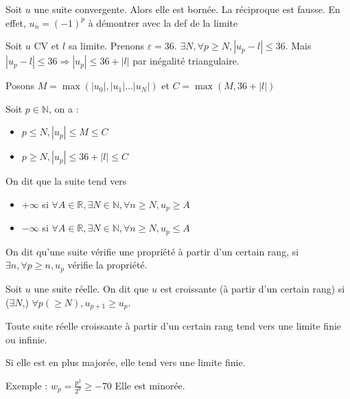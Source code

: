 \documentclass[french]{yLectureNote}
\newcommand{\N}[0]{\mathbb{N}}
\newcommand{\R}[0]{\mathbb{R}}
\begin{document}
\begin{proposition}
Soit $u$ une suite convergente. Alors elle est bornée. La réciproque est fausse. En effet, $u_n = (-1)^p$ à démontrer avec la def de la limite
\end{proposition}
\begin{myproof}
Soit $u$ CV et $l$ sa limite. Prenons $\varepsilon = 36$. $\exists N, \forall p\geq N, |u_p-l|\leq 36$. Mais $|u_p-l|\leq 36 \Rightarrow |u_p|\leq 36+|l|$ par inégalité triangulaire.

Posons $M = \max(|u_0|,|u_1|\dots |u_N|)$ et $C = \max(M,36+|l|)$

Soit $p\in \N$, on a :
\begin{itemize}
 \item $p\leq N, |u_p|\leq M\leq C$
 \item $p\geq N, |u_p|\leq 36+|l|\leq C$
\end{itemize}

\end{myproof}
\begin{definition}
On dit que la suite tend vers \begin{itemize}
                               \item $+\infty$ si $\forall A\in\R,\exists N\in\N, \forall n\geq N, u_p \geq A$
                               \item $-\infty$ si $\forall A\in\R,\exists N\in\N, \forall n\geq N, u_p \leq A$
                              \end{itemize}

\end{definition}
\begin{definition}
On dit qu'une suite vérifie une propriété à partir d'un certain rang, si $\exists n, \forall p\geq n, u_p$ vérifie la propriété.
\end{definition}
\begin{definition}
Soit $u$ une suite réelle. On dit que $u$ est croissante (à partir d'un certain rang) si ($\exists N$,) $\forall p (\geq N), u_{p+1} \geq u_p$.
\end{definition}
\begin{proposition}
Toute suite réelle croissante à partir d'un certain rang tend vers une limite finie ou infinie.

Si elle est en plus majorée, elle tend vers une limite finie.
\end{proposition}
Exemple : $w_p = \frac{p^2}{2^p} \geq -70$ Elle est minorée.
\end{document}
